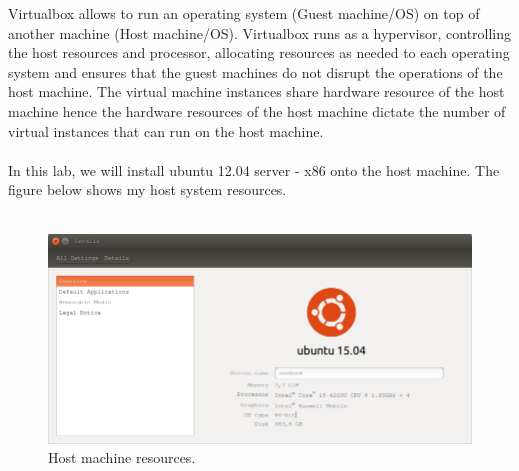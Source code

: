 \documentclass[12pt]{article}
\begin{document}
Virtualbox allows to run an operating system (Guest machine/OS) on top of another machine (Host machine/OS). Virtualbox runs as a hypervisor, controlling the host resources and processor, allocating resources as needed to each operating system and ensures that the guest machines do not disrupt the operations of the host machine. The virtual machine instances share hardware resource of the host machine hence the hardware resources of the host machine dictate the number of virtual instances that can run on the host machine.
\\\\
In this lab, we will install ubuntu 12.04 server - x86 onto the host machine. The figure below shows my host system resources.
\\\\
\begin{figure}[h!]
\centering
\includegraphics[width=1.0\textwidth]{hostresources.png}
\caption{\label{fig:resouce}Host machine resources.}
\end{figure}
\end{document}
